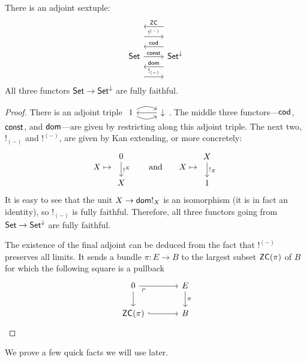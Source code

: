 \begin{prop}\label{prop:adjoint.sextuple}
  There is an adjoint sextuple:
  \[
    \begin{tikzcd}
      \Set \arrow[r, "\const"] \arrow[r, leftarrow, shift left = 5,
      "\term{cod}"] \arrow[r, leftarrow, shift right = 5, "\term{dom}"]
      \arrow[r, shift left = 10, "!^{(-)}"]  \arrow[r, shift right = 10,
      "!_{(-)}"] \arrow[r, leftarrow, shift left = 15, "\term{ZC}"]& \Set^{\down}
    \end{tikzcd}
  \]
  All three functors $\operatorname{\mathsf{{Set}}} \to \operatorname{\mathsf{{Set}}}^{\mathbin{\downarrow}}$ are fully faithful.
\end{prop}
\begin{proof}
There is an adjoint triple $\begin{tikzcd} 1 \arrow[r,leftarrow] \arrow[r,
  bend left] \arrow[r, bend right] & \down \end{tikzcd}$. The middle three
functors---$\mathsf{{cod}}$, $\mathsf{{const}}$, and $\mathsf{{dom}}$---are given by restricting along this adjoint triple. The next two, $!_{(-)}$ and $!^{(-)}$, are
given by Kan extending, or more concretely:
  \begin{equation}\label{eqn.bangbang}
  X \mapsto \begin{tikzcd} 0 \arrow[d, "!^X"] \\ X \end{tikzcd}
  \qquad\text{and}\qquad
  X \mapsto \begin{tikzcd} X \arrow[d, "!_X"] \\ 1 \end{tikzcd}
  \end{equation}
 It is easy to see that the unit $X \to \mathsf{{dom}} !_{X}$ is an isomorphism (it is in
fact an identity), so $!_{(-)}$ is fully faithful. Therefore, all three functors
going from $\operatorname{\mathsf{{Set}}} \to \operatorname{\mathsf{{Set}}}^{\mathbin{\downarrow}}$ are fully faithful.

The existence of the final adjoint can be deduced from the fact that $!^{(-)}$ preserves all
limits. It sends a bundle $\pi : E \to B$ to the largest subset $\mathsf{{ZC}}(\pi)$ of $B$ for
which the following square is a pullback
\[
  \begin{tikzcd}[column sep=large]
0 \arrow[r] \arrow[d] \arrow[dr, phantom,
"\ulcorner" very near start] & E \arrow[d, "\pi"] \\
\term{ZC}(\pi) \arrow[r, hookrightarrow]                                       & B
\end{tikzcd}
\qedhere
\]
\end{proof}
We prove a few quick facts we will use later.
